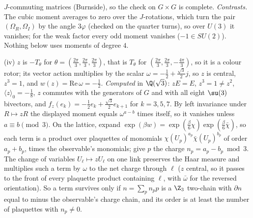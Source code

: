 $J$-commuting matrices (Burnside), so the check on $G \times G$ is complete. \emph{Contrasts.} The cubic moment averages to zero over the $J$-rotations, which turn the pair $(\Omega_R, \Omega_I)$ by the angle $3\varphi$ (checked on the quarter turns), so over $U(3)$ it vanishes; for the weak factor every odd moment vanishes ($-1 \in SU(2)$). Nothing below uses moments of degree $4$.

(iv) $z$ is $-T_\theta$ for $\theta = (\tfrac{2\pi}{3}, \tfrac{2\pi}{3}, \tfrac{2\pi}{3})$, that is $T_\theta$ for $(\tfrac{2\pi}{3}, \tfrac{2\pi}{3}, -\tfrac{4\pi}{3})$, so it is a colour rotor; its vector action multiplies by the scalar $\omega = -\tfrac12 + \tfrac{\sqrt3}{2}j$, so $z$ is central, $z^3 = 1$, and $w(z) = \mathrm{Re}\,\omega = -\tfrac12$. \emph{Computed} in $\Q(\sqrt3)$: $zE = E$, $z^3 = 1 \neq z^2$, $\langle z\rangle_0 = -\tfrac18$, $z$ commutes with the generators of $G$ and with all eight $\su(3)$ bivectors, and $f_z(e_k) = -\tfrac12e_k + \tfrac{\sqrt3}{2}e_{k+1}$ for $k = 3, 5, 7$. By left invariance under $R \mapsto zR$ the displayed moment equals $\omega^{a - b}$ times itself, so it vanishes unless $a \equiv b \pmod 3$. On the lattice, expand $\exp(\beta w) = \exp(\tfrac\beta6\chi)\exp(\tfrac\beta6\bar\chi)$, so each term is a product over plaquettes of monomials $\chi(U_p)^{a_p}\bar\chi(U_p)^{b_p}$ of order $a_p + b_p$, times the observable's monomials; give $p$ the charge $n_p = a_p - b_p \bmod 3$. The change of variables $U_\ell \mapsto zU_\ell$ on one link preserves the Haar measure and multiplies such a term by $\omega$ to the net charge through $\ell$ ($z$ central, so it passes to the front of every plaquette product containing $\ell$, with $\bar\omega$ for the reversed orientation). So a term survives only if $n = \sum_pn_pp$ is a $\Z_3$ two-chain with $\partial n$ equal to minus the observable's charge chain, and its order is at least the number of plaquettes with $n_p \neq 0$.

